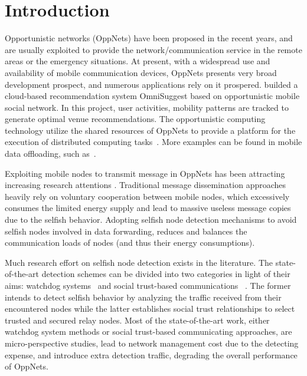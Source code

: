 \section{Introduction}
\label{sec:intro}
Opportunistic networks (OppNets)
have been proposed in the recent years,
and are usually exploited to provide the network/communication service
in the remote areas
or the emergency situations.
At present, with a widespread use and
availability of mobile communication devices,
OppNets presents very broad development prospect,
and numerous applications rely on it prospered.
\cite{DBLP:journals/tsc/KhalidKKZ14} builded a
cloud-based recommendation system OmniSuggest
based on opportunistic mobile social network.
In this project, user activities,
mobility patterns are tracked to
generate optimal venue recommendations.
The opportunistic computing technology utilize
the shared resources of OppNets to
provide a platform for the execution
of distributed computing tasks~\cite{DBLP:journals/tmc/ChatzopoulosAKH18}.
More examples can be found in mobile data offloading,
such as~\cite{DBLP:journals/tmc/HanHKMSS12,
DBLP:journals/tmc/LiQJHW014}.

Exploiting mobile nodes to transmit message in
OppNets has been attracting
increasing research attentions
\cite{DBLP:conf/sigcomm/SouzaMSMCC16,
DBLP:conf/mobicom/RadenkovicH17,
DBLP:journals/comsur/JedariXN18,
DBLP:journals/tmc/LoretiB20}.
Traditional message dissemination approaches
heavily rely on voluntary cooperation between
mobile nodes, which excessively consumes the
limited energy supply and lead to massive useless
message copies due to the selfish behavior.
Adopting selfish node detection mechanisms
to avoid selfish nodes involved in data forwarding,
reduces and balances the communication loads
of nodes (and thus their energy consumptions).


Much research effort on selfish node detection
exists in the literature. The state-of-the-art
detection schemes can be divided into two categories
in light of their aims:
watchdog systems~\cite{DBLP:conf/mobicom/MartiGLB00,
DBLP:journals/tmc/Hernandez-Orallo15,
DBLP:journals/tie/DiasRXM15,
DBLP:journals/fgcs/JedariXCDTA19}
and social trust-based communications
~\cite{DBLP:journals/tpds/ZhuDGDC14,
DBLP:journals/tdsc/ChoC18,
DBLP:journals/tmc/ChoiSLW12}.
The former intends to detect selfish behavior
by analyzing the traffic received
from their encountered nodes
while the latter establishes social trust relationships
to select trusted and secured relay nodes.
Most of the state-of-the-art work,
either watchdog system methods
or social trust-based communicating approaches,
are micro-perspective studies,
lead to network management cost
due to the detecting expense,
and introduce extra detection traffic,
degrading the overall performance of OppNets.

